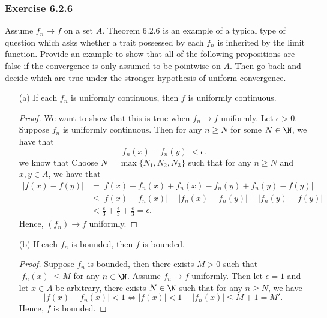 \subsubsection{Exercise 6.2.6} Assume \( f_n \to f  \) on a set \( A  \). Theorem 6.2.6 is an example of a typical type of question which asks whether a trait possessed by each \( f_n  \) is inherited by the limit function. Provide an example to show that all of the following propositions are false if the convergence is only assumed to be pointwise on \( A  \). Then go back and decide which are true under the stronger hypothesis of uniform convergence.
\begin{enumerate}
    \item[(a)] If each \( f_n  \) is uniformly continuous, then \( f  \) is uniformly continuous.
        \begin{proof}
        We want to show that this is true when \( f_n \to f   \) uniformly. Let \( \epsilon > 0  \). Suppose \( f_n  \) is uniformly continuous. Then for any \( n \geq N  \) for some \( N \in \N  \), we have that 
        \[  | f_n(x) - f_n(y)  | < \epsilon. \]we know that Choose \( N = \max \{  N_1, N_2, N_3  \}  \) such that for any \( n \geq N  \) and \( x,y \in A   \), we have that
        \begin{align*}
            | f(x) - f(y)  | &= | f(x) - f_n(x) + f_n(x) - f_n(y) + f_n(y) - f(y)  |  \\
                             &\leq | f(x) - f_n(x)  | + | f_n(x) - f_n(y)  | + | f_n(y) - f(y)  | \\
                             &< \frac{ \epsilon  }{ 3 } + \frac{ \epsilon  }{ 3 } + \frac{ \epsilon  }{ 3 } = \epsilon.
        \end{align*}
    Hence, \( (f_n) \to f  \) uniformly.
        \end{proof}
    \item[(b)] If each \( f_n  \) is bounded, then \( f  \) is bounded.
        \begin{proof}
        Suppose \( f_n  \) is bounded, then there exists \( M > 0  \) such that \( | f_n(x)  | \leq  M \) for any \( n \in \N  \). Assume \( f_n \to f  \) uniformly. Then let \( \epsilon = 1   \) and let \( x \in A  \) be arbitrary, there exists \( N \in \N  \) such that for any \( n \geq N  \), we have 
        \[  | f(x) - f_n(x)  | < 1 \iff | f(x) | < 1 + | f_n(x)     | \leq M + 1 = M'.  \]
        Hence, \( f  \) is bounded.
        \end{proof}
\end{enumerate}

